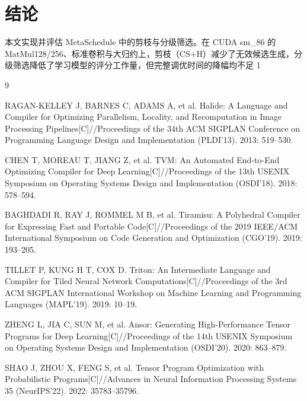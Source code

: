 \documentclass[11pt,twocolumn]{ctexart}
\begin{document}
\section{结论}
本文实现并评估 MetaSchedule 中的剪枝与分级筛选。在 CUDA sm\_86 的 MatMul128/256、标准卷积与大归约上，剪枝（CS+H）减少了无效候选生成，分级筛选降低了学习模型的评分工作量，但完整调优时间的降幅均不足 1%

\appendix




\begin{thebibliography}{9}
\raggedright
RAGAN-KELLEY J, BARNES C, ADAMS A, et al. Halide: A Language and Compiler for Optimizing Parallelism, Locality, and Recomputation in Image Processing Pipelines[C]//Proceedings of the 34th ACM SIGPLAN Conference on Programming Language Design and Implementation (PLDI'13). 2013: 519--530.

CHEN T, MOREAU T, JIANG Z, et al. TVM: An Automated End-to-End Optimizing Compiler for Deep Learning[C]//Proceedings of the 13th USENIX Symposium on Operating Systems Design and Implementation (OSDI'18). 2018: 578--594.

BAGHDADI R, RAY J, ROMMEL M B, et al. Tiramisu: A Polyhedral Compiler for Expressing Fast and Portable Code[C]//Proceedings of the 2019 IEEE/ACM International Symposium on Code Generation and Optimization (CGO'19). 2019: 193--205.

TILLET P, KUNG H T, COX D. Triton: An Intermediate Language and Compiler for Tiled Neural Network Computations[C]//Proceedings of the 3rd ACM SIGPLAN International Workshop on Machine Learning and Programming Languages (MAPL'19). 2019: 10--19.

ZHENG L, JIA C, SUN M, et al. Ansor: Generating High-Performance Tensor Programs for Deep Learning[C]//Proceedings of the 14th USENIX Symposium on Operating Systems Design and Implementation (OSDI'20). 2020: 863--879.

SHAO J, ZHOU X, FENG S, et al. Tensor Program Optimization with Probabilistic Programs[C]//Advances in Neural Information Processing Systems 35 (NeurIPS'22). 2022: 35783--35796.


\end{thebibliography}
\end{document}
